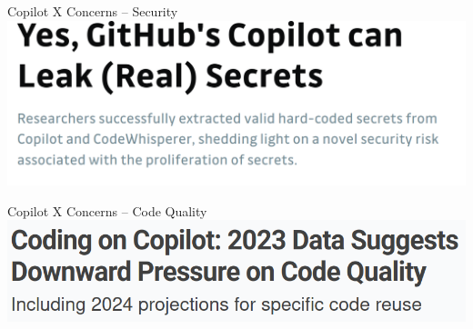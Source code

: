\documentclass[presentation, 10pt]{beamer}\mode<presentation>{\usetheme{AMSBolognaFC}}
\begin{document}
\begin{frame}{Copilot X Concerns -- Security}
\includegraphics[width=\textwidth]{img/copilot-concerns.png}
\end{frame}
\begin{frame}{Copilot X Concerns -- Code Quality}
	\includegraphics[width=\textwidth]{img/problem-code-quality.png}
	\end{frame}
\end{document}
